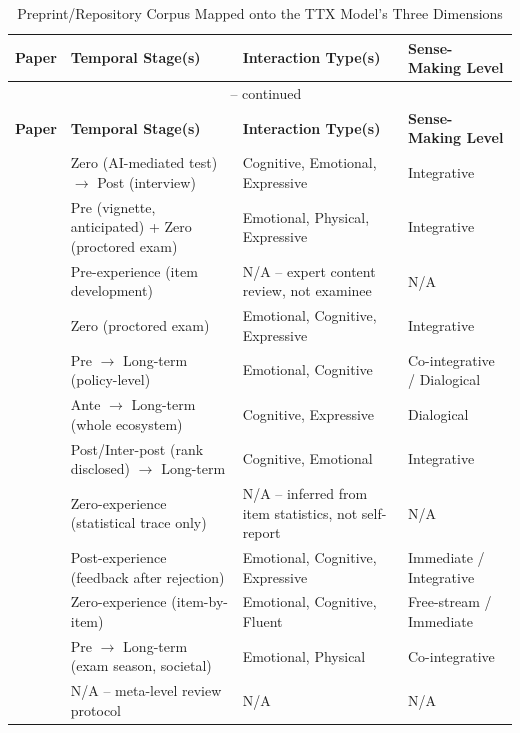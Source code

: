 \documentclass[11pt]{article}
\begin{document}
{\small
\begin{longtable}{p{2.6cm} p{4.3cm} p{4.3cm} p{3.3cm}}
\caption{Preprint/Repository Corpus Mapped onto the TTX Model's Three Dimensions} \label{tab:mapping} \\
\toprule
\textbf{Paper} & \textbf{Temporal Stage(s)} & \textbf{Interaction Type(s)} & \textbf{Sense-Making Level} \\
\midrule
\endfirsthead
\multicolumn{4}{c}{\tablename\ \thetable{} -- continued} \\
\toprule
\textbf{Paper} & \textbf{Temporal Stage(s)} & \textbf{Interaction Type(s)} & \textbf{Sense-Making Level} \\
\midrule
\endhead
\bottomrule
\endfoot
\citet{zhang2023testtakers} & Zero (AI-mediated test) $\rightarrow$ Post (interview) & Cognitive, Emotional, Expressive & Integrative \\
\citet{mukherjee2024proctoring} & Pre (vignette, anticipated) + Zero (proctored exam) & Emotional, Physical, Expressive & Integrative \\
\citet{stowe2024fairness} & Pre-experience (item development) & N/A -- expert content review, not examinee & N/A \\
\citet{balash2021examiners} & Zero (proctored exam) & Emotional, Cognitive, Expressive & Integrative \\
\citet{zhangw2024naplan} & Pre $\rightarrow$ Long-term (policy-level) & Emotional, Cognitive & Co-integrative / Dialogical \\
\citet{burstein2024responsible} & Ante $\rightarrow$ Long-term (whole ecosystem) & Cognitive, Expressive & Dialogical \\
\citet{ladant2023saliency} & Post/Inter-post (rank disclosed) $\rightarrow$ Long-term & Cognitive, Emotional & Integrative \\
\citet{suk2026unfairness} & Zero-experience (statistical trace only) & N/A -- inferred from item statistics, not self-report & N/A \\
\citet{feeney2022rejection} & Post-experience (feedback after rejection) & Emotional, Cognitive, Expressive & Immediate / Integrative \\
\citet{watson2026cat} & Zero-experience (item-by-item) & Emotional, Cognitive, Fluent & Free-stream / Immediate \\
\citet{george2024examstress} & Pre $\rightarrow$ Long-term (exam season, societal) & Emotional, Physical & Co-integrative \\
\citet{kaleta2025studentperspectives} & N/A -- meta-level review protocol & N/A & N/A \\

\end{longtable}}
\end{document}

